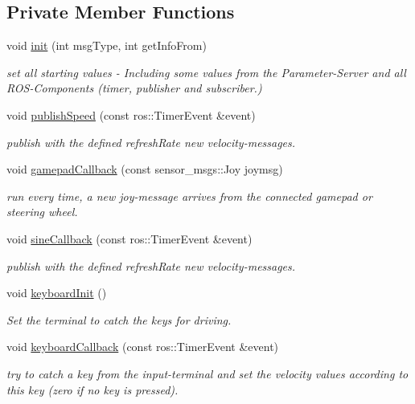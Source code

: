 \subsection*{Private Member Functions}
\begin{DoxyCompactItemize}
\item 
void \hyperlink{classSampleMoving_a822882ed03def337114e48822c8527bb}{init} (int msg\-Type, int get\-Info\-From)
\begin{DoxyCompactList}\small\item\em set all starting values -\/ Including some values from the Parameter-\/\-Server and all R\-O\-S-\/\-Components (timer, publisher and subscriber.) \end{DoxyCompactList}\item 
void \hyperlink{classSampleMoving_a1e43a9772d305ba33a96dc688efda406}{publish\-Speed} (const ros\-::\-Timer\-Event \&event)
\begin{DoxyCompactList}\small\item\em publish with the defined refresh\-Rate new velocity-\/messages. \end{DoxyCompactList}\item 
void \hyperlink{classSampleMoving_afa12c68ab6da0b3602d4e6adb19b6d35}{gamepad\-Callback} (const sensor\-\_\-msgs\-::\-Joy joymsg)
\begin{DoxyCompactList}\small\item\em run every time, a new joy-\/message arrives from the connected gamepad or steering wheel. \end{DoxyCompactList}\item 
void \hyperlink{classSampleMoving_aa573ef15d611d47b7510d49a1bec1ecd}{sine\-Callback} (const ros\-::\-Timer\-Event \&event)
\begin{DoxyCompactList}\small\item\em publish with the defined refresh\-Rate new velocity-\/messages. \end{DoxyCompactList}\item 
void \hyperlink{classSampleMoving_aeb90b5d883a76dfee266d55b81a8e671}{keyboard\-Init} ()
\begin{DoxyCompactList}\small\item\em Set the terminal to catch the keys for driving. \end{DoxyCompactList}\item 
void \hyperlink{classSampleMoving_a83fa32ef4b2ccfc7ae7a43629adf0d5c}{keyboard\-Callback} (const ros\-::\-Timer\-Event \&event)
\begin{DoxyCompactList}\small\item\em try to catch a key from the input-\/terminal and set the velocity values according to this key (zero if no key is pressed). \end{DoxyCompactList}\item 

\end{DoxyCompactItemize}
